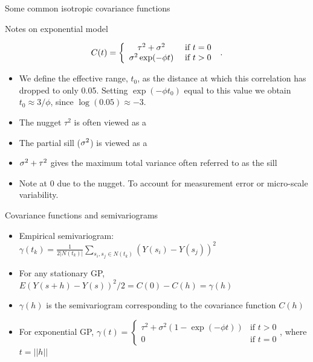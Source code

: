 \begin{frame}{Some common isotropic covariance functions}
\begin{table}[t]
\begin{center}
		\end{center}
	\end{table}
\end{frame}

\begin{frame}{Notes on exponential model}
	
	$$
	C(t) = \left \{ \begin{array}{cl}
	\tau^2 + \sigma^2 &  \mbox{  if }t=0\\
	\sigma^2 \exp(-\phi t) &  \mbox{  if }t>0\\
	\end{array}\right . \; .
	$$%
	
	\begin{itemize}
		
		\item We define the \alert{effective range},  
		$t_0$, as the distance at which this correlation has dropped to
		only 0.05. Setting $\exp(-\phi t_0)$ equal to this value we obtain
		$t_0 \approx 3/\phi$, since $\log(0.05) \approx -3$. %
		
		\item The \alert{nugget} $\tau^2$ is often viewed as a 
		
		\item The  \alert{partial sill} ($\sigma^2$) is viewed as a  %
		
		\item $\sigma^2 + \tau^2$ gives the maximum total variance often referred to as the \alert{sill}
		
		\item Note  at $0$ due to the nugget.   To account for measurement error or micro-scale variability.
	\end{itemize}
\end{frame}


\begin{frame}{Covariance functions and semivariograms}
	\begin{itemize}
		\item {} Empirical semivariogram: $\gamma(t_k) = \frac{1}{2|N(t_k)|}\sum_{s_i,s_j \in
		N(t_k)}(Y(s_i)-Y(s_j))^2$ 
	\item For any stationary GP, $E(Y(s+h)-Y(s))^2/2 = C(0)-C(h) = \gamma(h)$
	\item $\gamma(h)$ is the \alert{semivariogram} corresponding to the covariance function $C(h)$
	\item {} For exponential GP, $\gamma(t) = 
	\left \{ \begin{array} {cl}%
	\tau^{2}+\sigma^{2}(1-\exp(-\phi t)) & \mbox{if } t>0\\
	0 & \mbox{if } t=0
	\end{array} \right .$, where $t=||h||$
	\end{itemize}
\end{frame}

